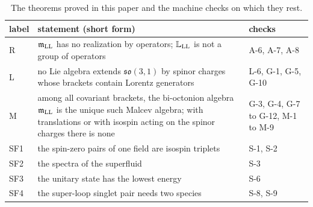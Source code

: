 \begin{table}[t]
\caption{The theorems proved in this paper and the machine checks on which they rest.}
\label{tab:theorems}
\begin{ruledtabular}
\begin{tabular}{p{}p{}p{}}
label & statement (short form) & checks\\
\hline
R & $\mathfrak m_{\rm LL}$ has no realization by operators; $\mathbb L_{\rm LL}$ is not a group of operators & A-6, A-7, A-8\\
L & no Lie algebra extends $\mathfrak{so}(3,1)$ by spinor charges whose brackets contain Lorentz generators & L-6, G-1, G-5, G-10\\
M & among all covariant brackets, the bi-octonion algebra $\mathfrak m_{\rm LL}$ is the unique such Malcev algebra; with translations or with isospin acting on the spinor charges there is none & G-3, G-4, G-7 to G-12, M-1 to M-9\\
SF1 & the spin-zero pairs of one field are isospin triplets & S-1, S-2\\
SF2 & the spectra of the superfluid & S-3\\
SF3 & the unitary state has the lowest energy & S-6\\
SF4 & the super-loop singlet pair needs two species & S-8, S-9\\
\end{tabular}
\end{ruledtabular}
\end{table}

